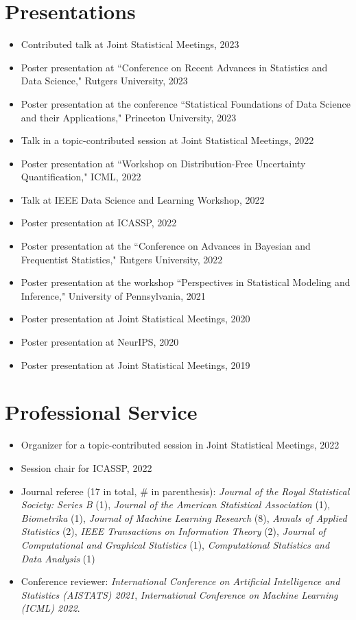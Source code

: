 \documentclass[letterpaper,11pt]{article}
\begin{document}
	\section{Presentations}
	\begin{itemize}
		\item Contributed talk at Joint Statistical Meetings, 2023
		\item Poster presentation at ``Conference on Recent Advances in Statistics and Data Science," Rutgers University, 2023
		\item Poster presentation at the conference ``Statistical Foundations of Data Science and their Applications," Princeton University, 2023
		\item Talk in a topic-contributed session at Joint Statistical Meetings, 2022
		\item Poster presentation at ``Workshop on Distribution-Free Uncertainty Quantification," ICML, 2022
		\item Talk at IEEE Data Science and Learning Workshop, 2022
		\item Poster presentation at ICASSP, 2022
		\item Poster presentation at the ``Conference on Advances in Bayesian and Frequentist Statistics," Rutgers University, 2022
		\item Poster presentation at the workshop ``Perspectives in Statistical Modeling and Inference," University of Pennsylvania, 2021
		\item Poster presentation at Joint Statistical Meetings, 2020
		\item Poster presentation at NeurIPS, 2020
		\item Poster presentation at Joint Statistical Meetings, 2019 
	\end{itemize}
	\section{Professional Service}
	\begin{itemize}
		\item Organizer for a topic-contributed session in Joint Statistical Meetings, 2022\\
		\item Session chair for ICASSP, 2022\\
		\item Journal referee (17 in total, \# in parenthesis): {\em Journal of the Royal Statistical Society: Series B} (1), {\em Journal of the American Statistical Association} (1), {\em Biometrika} (1), {\em Journal of Machine Learning Research} (8), {\em Annals of Applied Statistics} (2), {\em IEEE Transactions on Information Theory} (2), {\em Journal of Computational and Graphical Statistics} (1), {\em Computational Statistics and Data Analysis} (1)
		\item Conference reviewer: {\em International Conference on Artificial Intelligence and Statistics (AISTATS) 2021}, {\em International Conference on Machine Learning (ICML) 2022}.
	\end{itemize}
\end{document}

